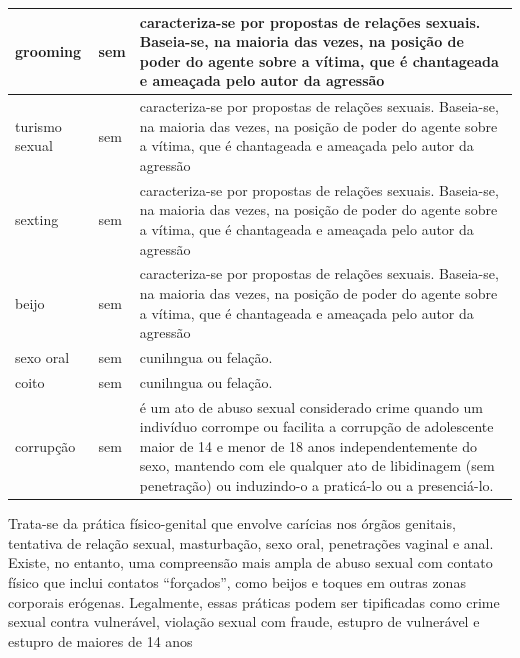 \begin{table}[h]
\begin{tabular}{    
    |>{\centering\arraybackslash}m{\x}
    |>{\centering\arraybackslash}m{\y}
    |>{\arraybackslash}m{\z}|
    }
    \\
\cline{1-1}\cline{2-2}\cline{3-3}
    grooming &
    sem &
    caracteriza-se por propostas de relações sexuais. Baseia-se, na maioria das vezes, na posição de poder do agente sobre a vítima, que é chantageada e ameaçada pelo autor da agressão
    \\
\cline{1-1}\cline{2-2}\cline{3-3}
    turismo sexual &
    sem &
    caracteriza-se por propostas de relações sexuais. Baseia-se, na maioria das vezes, na posição de poder do agente sobre a vítima, que é chantageada e ameaçada pelo autor da agressão
    \\
\cline{1-1}\cline{2-2}\cline{3-3}
    sexting &
    sem &
    caracteriza-se por propostas de relações sexuais. Baseia-se, na maioria das vezes, na posição de poder do agente sobre a vítima, que é chantageada e ameaçada pelo autor da agressão
    \\
\cline{1-1}\cline{2-2}\cline{3-3}
    beijo &
    sem &
    caracteriza-se por propostas de relações sexuais. Baseia-se, na maioria das vezes, na posição de poder do agente sobre a vítima, que é chantageada e ameaçada pelo autor da agressão
    \\
\cline{1-1}\cline{2-2}\cline{3-3}
    sexo oral &
    sem &
    cunilıngua ou felação.
    \\
\cline{1-1}\cline{2-2}\cline{3-3}
    coito &
    sem &
    cunilıngua ou felação.
    \\
\cline{1-1}\cline{2-2}\cline{3-3}
    corrupção  &
    sem &
    é um ato de abuso sexual considerado crime quando um indivíduo corrompe ou facilita a corrupção de adolescente maior de 14 e menor de 18 anos independentemente do sexo, mantendo com ele qualquer ato de libidinagem (sem penetração) ou induzindo-o a praticá-lo ou a presenciá-lo.
    \\
\hline
\end{tabular}
\end{table}

\begin{citacao}
  Trata-se da prática físico-genital que envolve carícias nos órgãos genitais, tentativa de relação sexual, masturbação, sexo oral, penetrações vaginal e anal. Existe, no entanto, uma compreensão mais ampla de abuso sexual com contato físico que inclui contatos ``forçados'', como beijos e toques em outras zonas corporais erógenas. Legalmente, essas práticas podem ser tipificadas como crime sexual contra vulnerável, violação sexual com fraude, estupro de vulnerável e estupro de maiores de 14 anos
  \end{citacao}


